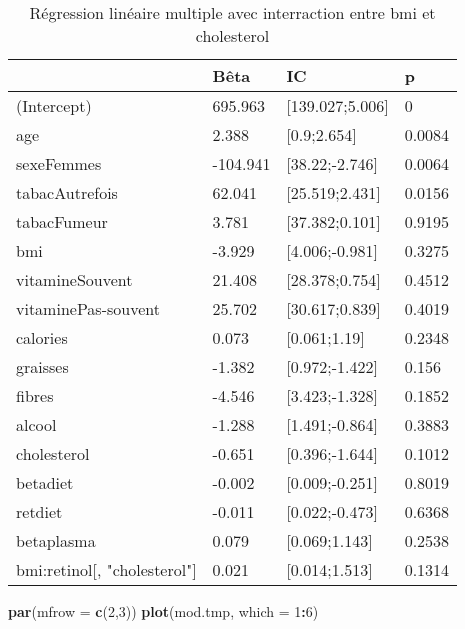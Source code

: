 \documentclass[]{article}
\newenvironment{Shaded}{\begin{snugshade}}{\end{snugshade}}
\newcommand{\KeywordTok}[1]{\textcolor[rgb]{0.13,0.29,0.53}{\textbf{#1}}}
\newcommand{\DataTypeTok}[1]{\textcolor[rgb]{0.13,0.29,0.53}{#1}}
\newcommand{\DecValTok}[1]{\textcolor[rgb]{0.00,0.00,0.81}{#1}}
\newcommand{\OperatorTok}[1]{\textcolor[rgb]{0.81,0.36,0.00}{\textbf{#1}}}
\newcommand{\NormalTok}[1]{#1}
\begin{document}
\begin{table}

\caption{\label{tab:unnamed-chunk-72}Régression linéaire multiple avec interraction entre bmi et cholesterol}
\centering
\begin{tabular}[t]{l|l|l|l}
\hline
  & Bêta & IC & p\\
\hline
\rowcolor[HTML]{BBD2E1}  (Intercept) & 695.963 & [139.027;5.006] & 0\\
\hline
age & 2.388 & [0.9;2.654] & 0.0084\\
\hline
\rowcolor[HTML]{BBD2E1}  sexeFemmes & -104.941 & [38.22;-2.746] & 0.0064\\
\hline
tabacAutrefois & 62.041 & [25.519;2.431] & 0.0156\\
\hline
\rowcolor[HTML]{BBD2E1}  tabacFumeur & 3.781 & [37.382;0.101] & 0.9195\\
\hline
bmi & -3.929 & [4.006;-0.981] & 0.3275\\
\hline
\rowcolor[HTML]{BBD2E1}  vitamineSouvent & 21.408 & [28.378;0.754] & 0.4512\\
\hline
vitaminePas-souvent & 25.702 & [30.617;0.839] & 0.4019\\
\hline
\rowcolor[HTML]{BBD2E1}  calories & 0.073 & [0.061;1.19] & 0.2348\\
\hline
graisses & -1.382 & [0.972;-1.422] & 0.156\\
\hline
\rowcolor[HTML]{BBD2E1}  fibres & -4.546 & [3.423;-1.328] & 0.1852\\
\hline
alcool & -1.288 & [1.491;-0.864] & 0.3883\\
\hline
\rowcolor[HTML]{BBD2E1}  cholesterol & -0.651 & [0.396;-1.644] & 0.1012\\
\hline
betadiet & -0.002 & [0.009;-0.251] & 0.8019\\
\hline
\rowcolor[HTML]{BBD2E1}  retdiet & -0.011 & [0.022;-0.473] & 0.6368\\
\hline
betaplasma & 0.079 & [0.069;1.143] & 0.2538\\
\hline
\rowcolor[HTML]{BBD2E1}  bmi:retinol[, "cholesterol"] & 0.021 & [0.014;1.513] & 0.1314\\
\hline
\end{tabular}
\end{table}

\begin{Shaded}
\begin{Highlighting}[]
\KeywordTok{par}\NormalTok{(}\DataTypeTok{mfrow =} \KeywordTok{c}\NormalTok{(}\DecValTok{2}\NormalTok{,}\DecValTok{3}\NormalTok{))}
\KeywordTok{plot}\NormalTok{(mod.tmp, }\DataTypeTok{which =} \DecValTok{1}\OperatorTok{:}\DecValTok{6}\NormalTok{)}
\end{Highlighting}
\end{Shaded}
\end{document}

